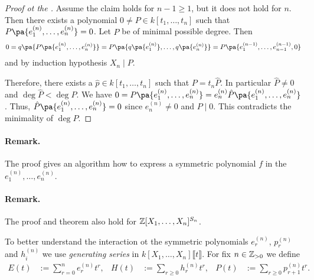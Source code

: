 \documentclass[12pt,a4paper]{scrartcl}
\theoremstyle{cplain}
\theoremstyle{cplain}
\theoremstyle{cplain}
\theoremstyle{definition}
\begin{document}
\begin{otherlanguage}{english}
\begin{proof}[Proof ot the ]
  Assume the claim holds for $n-1 \ge 1$, but it does not hold for $n$. Then there exists a polynomial $0 \neq P \in k[t_1,\ldots,t_n]$ such that $P\pa{e_1^{(n)},\ldots,e_n^{(n)}}=0$. Let $P$ be of minimal possible degree. Then \[ 0 = q\pa{P\pa{e_1^{(n)},\ldots,e_n^{(n)}}} = P\pa{q\pa{e_1^{(n)}},\ldots,q\pa{e_n^{(n)}}} = P\pa{e_1^{(n-1)},\ldots,e_{n-1}^{(n-1)},0} \] and by induction hypothesis $X_n \mid P$.
  
  Therefore, there exists a $\hat p \in k[t_1,\ldots,t_n]$ such that $P = t_n \hat P$. In particular $\hat P \neq 0$ and $\deg \hat P < \deg P$. We have $0 = P\pa{e_1^{(n)},\ldots,e_n^{(n)}} = e_n^{(n)}\hat P \pa{e_1^{(n)},\ldots,e_n^{(n)}}$. Thus, $\hat P\pa{e_1^{(n)},\ldots,e_n^{(n)}} = 0$ since $e_n^{(n)} \neq 0$ and $P \mid 0$. This contradicts the minimality of $\deg P$.
\end{proof}

\paragraph{Remark.} The proof gives an algorithm how to express a symmetric polynomial $f$ in the $e_1^{(n)},\ldots,e_n^{(n)}$.

\paragraph{Remark.} The proof and theorem also hold for $\mathbb Z[X_1,\ldots,X_n]^{S_n}$.

\bigskip

To better understand the interaction ot the symmetric polynomials $e_r^{(n)}$, $p_r^{(n)}$ and $h_i^{(n)}$ we use \emph{generating series} in $k[X_1,\ldots,X_n]\llbracket t\rrbracket$. For fix $n\in \mathbb Z_{>0}$ we define
\begin{align*}
  E(t) & := \sum_{r=0}^ne_r^{(n)}t^r, & H(t) & := \sum_{r\ge0}h_r^{(n)}t^r, & P(t) & := \sum_{r\ge 0} p_{r+1}^{(n)}t^r.
\end{align*}


\end{otherlanguage}
\end{document}
